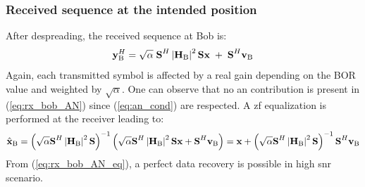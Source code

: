 \subsubsection{Received sequence at the intended position}
After despreading, the received sequence at Bob is: 
\begin{equation}
    \textbf{y}_{\text{B}}^H = \sqrt{\alpha} \; \textbf{S}^H \left|\textbf{H}_{\text{B}}\right|^2 \textbf{S} \textbf{x} \;  +  \;  \textbf{S}^H \textbf{v}_\text{B} 
    \label{eq:rx_bob_AN}
\end{equation}
Again, each transmitted symbol is affected by a real gain depending on the BOR value and weighted by $\sqrt{\alpha}$. One can observe that no \gls{an} contribution is present in (\ref{eq:rx_bob_AN}) since (\ref{eq:an_cond}) are respected. A \gls{zf} equalization is performed at the receiver leading to:
\begin{equation}
    \hat{\textbf{x}}_{\text{B}} = \left( \sqrt{\alpha} \textbf{S}^H \left|\textbf{H}_{\text{B}}\right|^2 \textbf{S} \right)^{-1}  \left(\sqrt{\alpha}  \textbf{S}^H\left|\textbf{H}_{\text{B}}\right|^2 \textbf{S} \textbf{x}   +    \textbf{S}^H \textbf{v}_\text{B}\right)= \textbf{x} + \left( \sqrt{\alpha} \textbf{S}^H \left|\textbf{H}_{\text{B}}\right|^2 \textbf{S} \right)^{-1} \textbf{S}^H \textbf{v}_\text{B}
    \label{eq:rx_bob_AN_eq}
\end{equation}
From (\ref{eq:rx_bob_AN_eq}), a perfect data recovery is possible in high \gls{snr} scenario.


